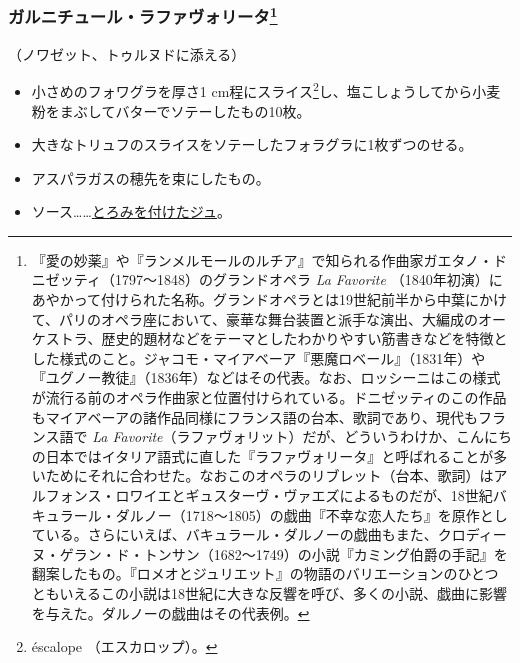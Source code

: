 \begin{recette}
\hypertarget{garniture-a-la-favorite}{%
\subsubsection[ガルニチュール・ラファヴォリータ]{\texorpdfstring{ガルニチュール・ラファヴォリータ\footnote{『愛の妙薬』や『ランメルモールのルチア』で知られる作曲家ガエタノ・ドニゼッティ（1797〜1848）のグランドオペラ
  \emph{La Favorite}
  （1840年初演）にあやかって付けられた名称。グランドオペラとは19世紀前半から中葉にかけて、パリのオペラ座において、豪華な舞台装置と派手な演出、大編成のオーケストラ、歴史的題材などをテーマとしたわかりやすい筋書きなどを特徴とした様式のこと。ジャコモ・マイアベーア『悪魔ロベール』（1831年）や『ユグノー教徒』（1836年）などはその代表。なお、ロッシーニはこの様式が流行る前のオペラ作曲家と位置付けられている。ドニゼッティのこの作品もマイアベーアの諸作品同様にフランス語の台本、歌詞であり、現代もフランス語で
  \emph{La
  Favorite}（ラファヴォリット）だが、どういうわけか、こんにちの日本ではイタリア語式に直した『ラファヴォリータ』と呼ばれることが多いためにそれに合わせた。なおこのオペラのリブレット（台本、歌詞）はアルフォンス・ロワイエとギュスターヴ・ヴァエズによるものだが、18世紀バキュラール・ダルノー（1718〜1805）の戯曲『不幸な恋人たち』を原作としている。さらにいえば、バキュラール・ダルノーの戯曲もまた、クロディーヌ・ゲラン・ド・トンサン（1682〜1749）の小説『カミング伯爵の手記』を翻案したもの。『ロメオとジュリエット』の物語のバリエーションのひとつともいえるこの小説は18世紀に大きな反響を呼び、多くの小説、戯曲に影響を与えた。ダルノーの戯曲はその代表例。}}{ガルニチュール・ラファヴォリータ}}\label{garniture-a-la-favorite}}



（ノワゼット、トゥルヌドに添える）

\begin{itemize}
\item
  小さめのフォワグラを厚さ1 cm程にスライス\footnote{éscalope
    （エスカロップ）。}し、塩こしょうしてから小麦粉をまぶしてバターでソテーしたもの10枚。
\item
  大きなトリュフのスライスをソテーしたフォラグラに1枚ずつのせる。
\item
  アスパラガスの穂先を束にしたもの。
\item
  ソース\ldots{}\ldots{}\protect\hyperlink{jus-de-veau-lie}{とろみを付けたジュ}。
\end{itemize}
\end{recette}